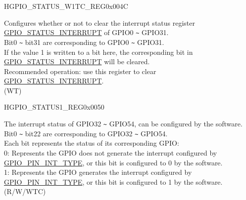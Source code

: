 \begin{register}{H}{GPIO\_STATUS\_W1TC\_REG}{0x004C}\label{regdesc:GPIOSTATUSW1TCREG}
%
\regnewline%
\begin{regdesc}\begin{reglist}
\label{fielddesc:GPIOSTATUSW1TC}\item [GPIO\_STATUS\_W1TC] Configures whether or not to clear the interrupt status register \hyperref[fielddesc:GPIOSTATUSINTERRUPT]{GPIO\_STATUS\_INTERRUPT} of GPIO0 \verb+~+ GPIO31. \\
Bit0 \verb+~+ bit31 are corresponding to GPIO0 \verb+~+ GPIO31.\\
If the value 1 is written to a bit here, the corresponding bit in \hyperref[fielddesc:GPIOSTATUSINTERRUPT]{GPIO\_STATUS\_INTERRUPT} will be cleared.\\
Recommended operation: use this register to clear \hyperref[fielddesc:GPIOSTATUSINTERRUPT]{GPIO\_STATUS\_INTERRUPT}. \\
(WT)
\end{reglist}\end{regdesc}
\end{register}


\begin{register}{H}{GPIO\_STATUS1\_REG}{0x0050}\label{regdesc:GPIOSTATUS1REG}
%
%
\regnewline%
\begin{regdesc}\begin{reglist}
\label{fielddesc:GPIOSTATUS1INTERRUPT}\item [GPIO\_STATUS1\_INTERRUPT] The interrupt status of GPIO32 \verb+~+ GPIO54, can be configured by the software. \\
Bit0 \verb+~+ bit22 are corresponding to GPIO32 \verb+~+ GPIO54.\\
Each bit represents the status of its corresponding GPIO:\\
0: Represents the GPIO does not generate the interrupt configured by \hyperref[fielddesc:GPIOPINNINTTYPE]{GPIO\_PIN\_INT\_TYPE}, or this bit is configured to 0 by the software.\\
1: Represents the GPIO generates the interrupt configured by \hyperref[fielddesc:GPIOPINNINTTYPE]{GPIO\_PIN\_INT\_TYPE}, or this bit is configured to 1 by the software.\\
(R/W/WTC)
\end{reglist}\end{regdesc}
\end{register}


